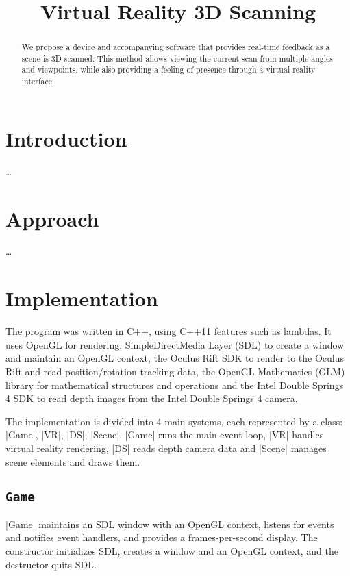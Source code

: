\documentclass[pageno]{jpaper}
\begin{document}
\title{Virtual Reality 3D Scanning}

\date{}
\maketitle

\thispagestyle{empty}

\begin{abstract}
  We propose a device and accompanying software that provides real-time feedback
  as a scene is 3D scanned. This method allows viewing the current scan from
  multiple angles and viewpoints, while also providing a feeling of presence
  through a virtual reality interface.
\end{abstract}

\section{Introduction}

\ldots

\section{Approach}

\ldots

\section{Implementation}

The program was written in C++, using C++11 features such as lambdas. It uses
OpenGL for rendering, SimpleDirectMedia Layer (SDL) to create a window and
maintain an OpenGL context, the Oculus Rift SDK to render to the Oculus Rift and
read position/rotation tracking data, the OpenGL Mathematics (GLM) library for
mathematical structures and operations and the Intel Double Springs 4 SDK to
read depth images from the Intel Double Springs 4 camera.

The implementation is divided into 4 main systems, each represented by a class:
|Game|, |VR|, |DS|, |Scene|. |Game| runs the main event loop, |VR| handles
virtual reality rendering, |DS| reads depth camera data and |Scene| manages
scene elements and draws them.

\subsection{\lstinline|Game|}

|Game| maintains an SDL window with an OpenGL context, listens for events and
notifies event handlers, and provides a frames-per-second display. The
constructor initializes SDL, creates a window and an OpenGL context, and the
destructor quits SDL.
\end{document}
